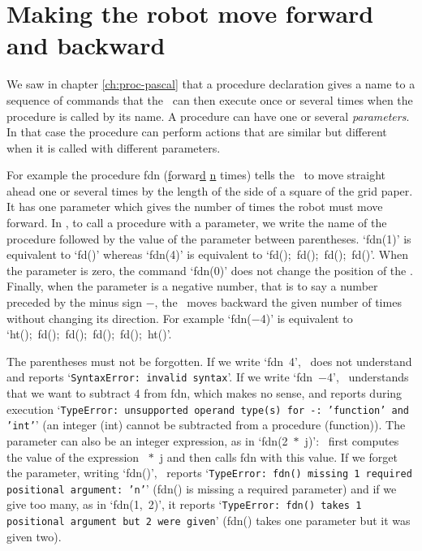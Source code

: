 \section{Making the robot move forward and backward}

We saw in chapter \ref{ch:proc-pascal} that a procedure
declaration gives a name to a sequence of commands that the
\robot\ can then execute once or several times when the procedure is called by its name.
A procedure can have one or several {\em parameters}. In that case the procedure
can perform actions that are similar but different when it is called with different
parameters.

For example the procedure
 {\idt fdn} (\underline{f}orwar\underline{d} \underline{n} times) tells the \robot\ to move straight ahead one
or several times by the length of the side of a square of the grid paper.
It has one parameter which gives the number of times the robot must move forward.
In \python, to call a procedure with a parameter, we write the name of the procedure followed
by the value of the parameter between parentheses.
`{\idt fdn(1)}' is equivalent to `{\idt fd()}' whereas
`{\idt fdn(4)}' is equivalent to `{\idt fd();\ fd();\ fd();\ fd()}'.
When the parameter is zero, the command `{\idt fdn(0)}' does not change the position of the \robot.
Finally, when the parameter is a negative number, that is to say a number preceded by the
minus sign $-$, the \robot\ moves backward the given number of times without changing its direction. For example
`{\idt fdn($-$4)}' is equivalent to `{\idt ht();\ fd();\ fd();\ fd();\ fd();\ ht()}'.

The parentheses must not be forgotten. If we write `{\idt fdn\ 4}', \python\ does not understand
and reports `{\tt SyntaxError: invalid syntax}'. If we write `{\idt fdn\ $-$4}', \python\
understands that we want to subtract 4 from {\idt fdn}, which makes no sense, and
reports during execution
`{\tt TypeError: unsupported operand type(s) for -: 'function' and 'int'}'
(an integer ({\idt int}) cannot be subtracted from a procedure ({\idt function})).
The parameter can also be an integer expression, as
in `{\idt fdn(2\ $\ast$\ j)}': \python\ first computes the value of the expression
{\idt 2\ $\ast$\ j} and then calls {\idt fdn} with this value.
If we forget the parameter, writing `{\idt fdn()}', \python\ reports
`{\tt TypeError: fdn() missing 1 required positional argument: 'n'}'
({\idt fdn()} is missing a required parameter) and if we give too many, as in
`{\idt fdn(1,\ 2)}', it reports
`{\tt TypeError: fdn() takes 1 positional argument but 2 were given}'
({\idt fdn()} takes one parameter but it was given two).

